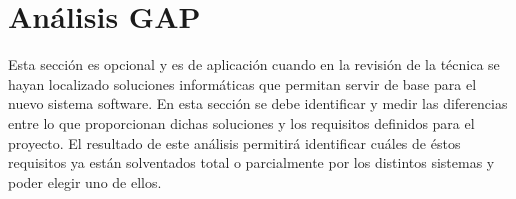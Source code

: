 \section{Análisis GAP}
Esta sección es opcional y es de aplicación cuando en la revisión de la técnica se hayan localizado soluciones informáticas que permitan servir de base para el nuevo sistema software. En esta sección se debe identificar y medir las diferencias entre lo que proporcionan dichas soluciones y los requisitos definidos para el proyecto. El resultado de este análisis permitirá identificar cuáles de éstos requisitos ya están solventados total o parcialmente por los distintos sistemas y poder elegir uno de ellos. 